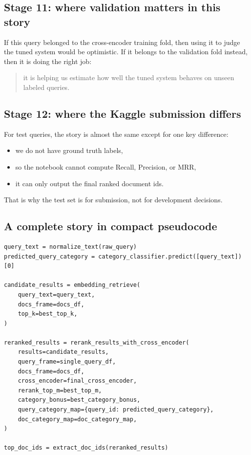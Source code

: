 \documentclass[10pt]{article}
\begin{document}
\subsection*{Stage 11: where validation matters in this story}

If this query belonged to the cross-encoder training fold, then using it to judge the tuned system would be optimistic. If it belongs to the validation fold instead, then it is doing the right job:
\begin{quote}
it is helping us estimate how well the tuned system behaves on unseen labeled queries.
\end{quote}

\subsection*{Stage 12: where the Kaggle submission differs}

For test queries, the story is almost the same except for one key difference:
\begin{itemize}
    \item we do not have ground truth labels,
    \item so the notebook cannot compute Recall, Precision, or MRR,
    \item it can only output the final ranked document ids.
\end{itemize}

That is why the test set is for submission, not for development decisions.

\subsection*{A complete story in compact pseudocode}

\begin{lstlisting}[caption={One query moving through the pipeline}]
query_text = normalize_text(raw_query)
predicted_query_category = category_classifier.predict([query_text])[0]

candidate_results = embedding_retrieve(
    query_text=query_text,
    docs_frame=docs_df,
    top_k=best_top_k,
)

reranked_results = rerank_results_with_cross_encoder(
    results=candidate_results,
    query_frame=single_query_df,
    docs_frame=docs_df,
    cross_encoder=final_cross_encoder,
    rerank_top_m=best_top_m,
    category_bonus=best_category_bonus,
    query_category_map={query_id: predicted_query_category},
    doc_category_map=doc_category_map,
)

top_doc_ids = extract_doc_ids(reranked_results)
\end{lstlisting}
\end{document}
